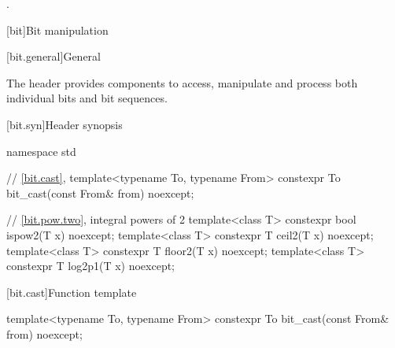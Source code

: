 \begin{itemdescr}
\pnum
\returns
{}.
\end{itemdescr}


[bit]{Bit manipulation}

[bit.general]{General}

\pnum
The header  provides components to access,
manipulate and process both individual bits and bit sequences.

[bit.syn]{Header  synopsis}
%
\begin{codeblock}
namespace std {
  // \ref{bit.cast}, 
  template<typename To, typename From>
    constexpr To bit_cast(const From& from) noexcept;

  // \ref{bit.pow.two}, integral powers of 2
  template<class T>
    constexpr bool ispow2(T x) noexcept;
  template<class T>
    constexpr T ceil2(T x) noexcept;
  template<class T>
    constexpr T floor2(T x) noexcept;
  template<class T>
    constexpr T log2p1(T x) noexcept;
}
\end{codeblock}

[bit.cast]{Function template }

%
\begin{itemdecl}
template<typename To, typename From>
  constexpr To bit_cast(const From& from) noexcept;
\end{itemdecl}

